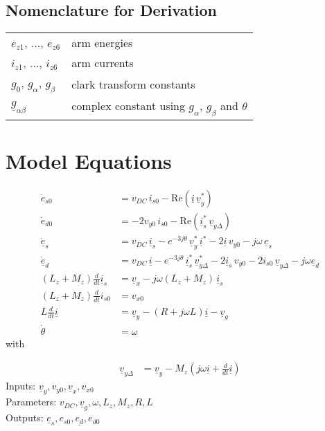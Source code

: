 \documentclass[10pt,a4paper]{article}
\begin{document}
	\subsection{Nomenclature for Derivation}
	
	\begin{tabular}{ll}
		$e_{z1}$, ..., $e_{z6}$ & arm energies\\
		$i_{z1}$, ..., $i_{z6}$ & arm currents \\
		$g_0$, $g_\alpha$, $g_\beta$ & clark transform constants \\
		$\underline{g}_{\alpha\beta}$ & complex constant using $g_\alpha$, $g_\beta$ and $\theta$ 
	\end{tabular}
	
	\section{Model Equations}
	\begin{subequations}
	\begin{align}
		\dot{e}_{s0} &= v_{DC} \, i_{s0} - \mathrm{Re} (\underline{i}\, \underline{v}_y^*)				\\
		\dot{e}_{d0} &=-2 v_{y0}\, i_{s0} - \mathrm{Re} (\underline{i}_s^* \, \underline{v}_{y\Delta})		\\
		\dot{\underline{e}}_s &=v_{DC}\, \underline{i}_s - e^{-3j\theta}\, \underline{v}_y^* \, \underline{i}^* - 2 \underline{i}\, v_{y0} - j\omega \, \underline{e}_s 		\\
		\dot{\underline{e}}_d &= v_{DC}\, \underline{i} - e^{-3j\theta}\, \underline{i}_s^* \, \underline{v}_{y\Delta}^* - 2 \underline{i}_s \, v_{y0} - 2 i_{s0}\, \underline{v}_{y\Delta} - j\omega \underline{e}_d		 \\
		(L_z+M_z)\frac{d}{dt} \underline{i}_s &= \underline{v}_x - j\omega (L_z+M_z)\, \underline{i}_s		\\
		(L_z+M_z)\frac{d}{dt} i_{s0} &= v_{x0}		\\
		L \frac{d}{dt}\underline{i} &= \underline{v}_y - (R+j\omega L)\underline{i} - \underline{v}_g	\\
		\dot{\theta} &= \omega
	\end{align}
	\end{subequations}
	with
	
	\begin{align}
		\underline{v}_{y\Delta} &= \underline{v}_y - M_z (j\omega \underline{i} + \frac{d}{dt}\underline{i})
	\end{align}
	Inputs: $\underline{v}_y,v_{y0},\underline{v}_x,v_{x0}$ 
	\\
	Parameters: $v_{DC},\underline{v}_g,\omega,L_z,M_z,R,L$
	\\
	Outputs: $\underline{e}_s,e_{s0},\underline{e_d},e_{d0}$
	
\end{document}

